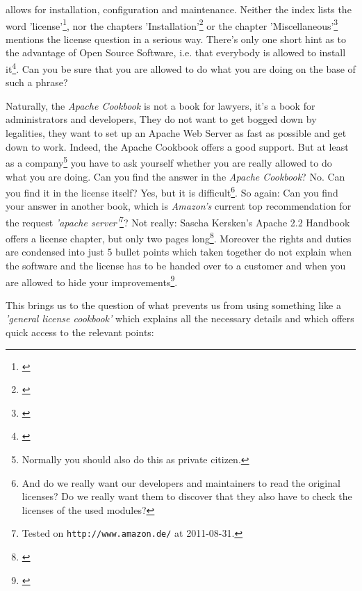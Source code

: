 allows for installation, configuration and maintenance. Neither the index lists
the word 'license'\footnote{\cite[cf.][245ff, esp. p. 250]{CoaBow2004a}}, nor
the chapters 'Installation'\footnote{\cite[cf.][1ff]{CoaBow2004a}} or the
chapter 'Miscellaneous'\footnote{\cite[cf.][219ff]{CoaBow2004a}} mentions the
license question in a serious way. There's only one short hint as to the
advantage of Open Source Software, i.e. that everybody is allowed to install
it\footnote{\cite[cf.][1: \glqq{} \ldots einer der Vorzüge von Open Source
Software besteht darin, dass je\-der\-mann die Erlaubnis zur Erzeugung eines
eigenen Installationskits hat \grqq{}]{CoaBow2004a}}. Can you be sure that you
are allowed to do what you are doing on the base of such a phrase?

Naturally, the \emph{Apache Cookbook} is not a book for lawyers, it's a book for
administrators and developers, They do not want to get bogged down by legalities,
they want to set up an Apache Web Server as fast as possible and get down to
work. Indeed, the Apache Cookbook offers a good support. But at least as a
company\footnote{Normally you should also do this as private citizen.} you have
to ask yourself whether you are really allowed to do what you are doing. Can you
find the answer in the \emph{Apache Cookbook}? No. Can you find it in the
license itself? Yes, but it is difficult\footnote{And do we really want our
developers and maintainers to read the original licenses? Do we really want them
to discover that they also have to check the licenses of the used modules?}. So
again: Can you find your answer in another book, which is \emph{Amazon's}
current top recommendation for the request \emph{'apache
server'}\footnote{Tested on \texttt{http://www.amazon.de/} at 2011-08-31.}? Not
really: Sascha Kersken's Apache 2.2 Handbook offers a license chapter, but only
two pages long\footnote{\cite[cf.][111f]{Kersken2009a}}. Moreover the rights and
duties are condensed into just 5 bullet points which taken together do not
explain when the software and the license has to be handed over to a customer
and when you are allowed to hide your
improvements\footnote{\cite[cf.][112]{Kersken2009a}}.

This brings us to the question of what prevents us from using something like a
\emph{'general license cookbook'} which explains all the necessary details and which
offers  quick access to the relevant points:

%

